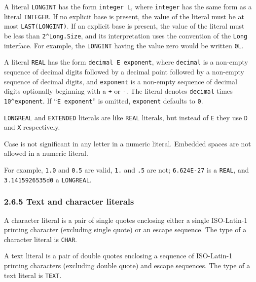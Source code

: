 \documentclass[10pt]{article}
\begin{document}
A literal \verb|LONGINT| has the form \verb|integer L|, where \verb|integer|
has the same form as a literal \verb|INTEGER|.  If no explicit base is
present, the value of the literal must be at most \verb|LAST(LONGINT)|.  If an
explicit base is present, the value of the literal must be less than
\verb|2^Long.Size|, and its interpretation uses the convention of the
\verb|Long| interface.  For example, the \verb|LONGINT| having the value zero
would be written \verb|0L|.

A literal \verb|REAL| has the form \verb|decimal E exponent|, where
\verb|decimal| is a non-empty sequence of decimal digits followed by a decimal
point followed by a non-empty sequence of decimal digits, and \verb|exponent|
is a non-empty sequence of decimal digits optionally beginning with a \verb|+|
or \verb|-|.  The literal denotes \verb|decimal| times \verb|10^exponent|.  If
``\verb|E exponent|'' is omitted, \verb|exponent| defaults to \verb|0|.

\verb|LONGREAL| and \verb|EXTENDED| literals are like \verb|REAL| literals,
but instead of \verb|E| they use \verb|D| and \verb|X| respectively.

Case is not significant in any letter in a numeric literal.  
Embedded spaces are not allowed in a numeric literal.

For example, \verb|1.0| and \verb|0.5| are valid, \verb|1.| and \verb|.5| are
not; \verb|6.624E-27| is a \verb|REAL|, and \verb|3.1415926535d0| a
\verb|LONGREAL|.

\subsubsection*{2.6.5 Text and character literals}

A character literal is a pair of single quotes enclosing either a single
ISO-Latin-1 printing character (excluding single quote) or an escape sequence.
The type of a character literal is \verb|CHAR|.

A text literal is a pair of double quotes enclosing a sequence of ISO-Latin-1
printing characters (excluding double quote) and escape sequences.  The type
of a text literal is \verb|TEXT|.
\end{document}
